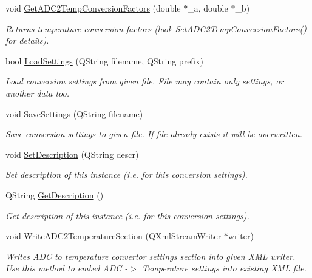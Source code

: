 \begin{DoxyCompactItemize}
void \hyperlink{class_adc_temperature_convertor_af7c23effdc32aa35c14813fd334572f2}{Get\+A\+D\+C2\+Temp\+Conversion\+Factors} (double $\ast$\+\_\+a, double $\ast$\+\_\+b)
\begin{DoxyCompactList}\small\item\em Returns temperature conversion factors (look \hyperlink{class_adc_temperature_convertor_a4850843e55992608213cc9cf82d36830}{Set\+A\+D\+C2\+Temp\+Conversion\+Factors()} for details). \end{DoxyCompactList}\item 
bool \hyperlink{class_adc_temperature_convertor_ac45f10e678aa2f9e25c5351dfd283de0}{Load\+Settings} (Q\+String filename, Q\+String prefix)
\begin{DoxyCompactList}\small\item\em Load conversion settings from given file. File may contain only settings, or another data too. \end{DoxyCompactList}\item 
void \hyperlink{class_adc_temperature_convertor_aa6935469c6bb9e2df9a21495d7e8b72a}{Save\+Settings} (Q\+String filename)
\begin{DoxyCompactList}\small\item\em Save conversion settings to given file. If file already exists it will be overwritten. \end{DoxyCompactList}\item 
void \hyperlink{class_adc_temperature_convertor_a56103443d7da4769339ddb685a0a8df0}{Set\+Description} (Q\+String descr)
\begin{DoxyCompactList}\small\item\em Set description of this instance (i.\+e. for this conversion settings). \end{DoxyCompactList}\item 
Q\+String \hyperlink{class_adc_temperature_convertor_ad82afdddbac46a95b6da44e769180d10}{Get\+Description} ()
\begin{DoxyCompactList}\small\item\em Get description of this instance (i.\+e. for this conversion settings). \end{DoxyCompactList}\item 
void \hyperlink{class_adc_temperature_convertor_aa06c19d0ac9f45d6f2f67718eda042ac}{Write\+A\+D\+C2\+Temperature\+Section} (Q\+Xml\+Stream\+Writer $\ast$writer)
\begin{DoxyCompactList}\small\item\em Writes A\+DC to temperature convertor settings section into given X\+ML writer. Use this method to embed A\+DC -\/$>$ Temperature settings into existing X\+ML file. \end{DoxyCompactList}\end{DoxyCompactItemize}
